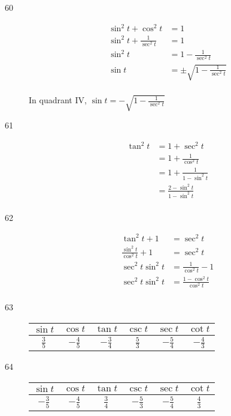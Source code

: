 \documentclass{exam}
\begin{document}
\begin{description}
      \item[60] 
        \begin{align*}
          \sin^2 t + \cos^2 t           & = 1 \\
          \sin^2 t + \frac{1}{\sec^2 t} & = 1 \\
          \sin^2 t                      & = 1 - \frac{1}{\sec^2 t} \\
          \sin t                        & = \pm \sqrt{ 1 - \frac{1}{\sec^2 t} } \\
        \end{align*}

        In quadrant IV, $\sin t = \boxed{ - \sqrt{ 1 - \frac{1}{\sec^2 t} } }$ 

      \item[61] 
        \begin{align*}
          \tan^2 t & = 1 + \sec^2 t \\
                   & = 1 + \frac{1}{\cos^2 t} \\
                   & = 1 + \frac{1}{1 - \sin^2 t} \\
                   & = \boxed{ \frac{2 - \sin^2 t}{1 - \sin^2 t} } \\
        \end{align*}

      \item[62] 
        \begin{align*}
          \tan^2 t + 1                  & = \sec^2 t \\
          \frac{\sin^2 t}{\cos^2 t} + 1 & = \sec^2 t \\
          \sec^2 t \sin^2 t             & = \frac{1}{\cos^2 t} - 1 \\
          \sec^2 t \sin^2 t             & = \boxed{ \frac{1 - \cos^2 t}{\cos^2 t} } \\
        \end{align*}

      \item[63]
        \begin{tabular}[H]{cccccc}
          \toprule
          $\sin t$      & $\cos t$        & $\tan t$        & $\csc t$      & $\sec t$        & $\cot t$ \\
          \midrule
          $\frac{3}{5}$ & $- \frac{4}{5}$ & $- \frac{3}{4}$ & $\frac{5}{3}$ & $- \frac{5}{4}$ & $- \frac{4}{3}$ \\
          \bottomrule
        \end{tabular}

      \item[64]
        \begin{tabular}[H]{cccccc}
          \toprule
          $\sin t$        & $\cos t$        & $\tan t$      & $\csc t$        & $\sec t$        & $\cot t$ \\
          \midrule
          $- \frac{3}{5}$ & $- \frac{4}{5}$ & $\frac{3}{4}$ & $- \frac{5}{3}$ & $- \frac{5}{4}$ & $\frac{4}{3}$ \\
          \bottomrule
        \end{tabular}


\end{description}
\end{document}
